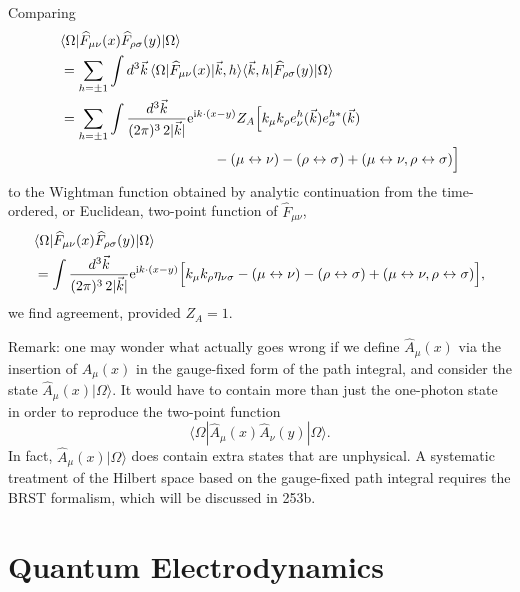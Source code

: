 Comparing
\[
\begin{aligned}
  &\langle\Omega|
  \widehat F_{\mu\nu}(x)\widehat F_{\rho\sigma}(y)
  |\Omega\rangle
\\
  &=
  \sum_{h=\pm1}
  \int d^3\vec k\,
  \langle\Omega|\widehat F_{\mu\nu}(x)|\vec k,h\rangle
  \langle\vec k,h|\widehat F_{\rho\sigma}(y)|\Omega\rangle
\\
  &=
  \sum_{h=\pm1}
  \int\frac{d^3\vec k}{(2\pi)^3\,2|\vec k|}
  \ee^{\ii k\cdot(x-y)}Z_A
  \Bigl[
    k_\mu k_\rho e_\nu^h(\vec k)e_\sigma^{h*}(\vec k)
\\
  &\hspace{11em}
    -(\mu\leftrightarrow\nu)
    -(\rho\leftrightarrow\sigma)
    +(\mu\leftrightarrow\nu,\rho\leftrightarrow\sigma)
  \Bigr]
\end{aligned}
\]
to the Wightman function obtained by analytic continuation from the
time-ordered, or Euclidean, two-point function of \(\widehat F_{\mu\nu}\),
\[
\begin{aligned}
  &\langle\Omega|
  \widehat F_{\mu\nu}(x)\widehat F_{\rho\sigma}(y)
  |\Omega\rangle
\\
  &=
  \int\frac{d^3\vec k}{(2\pi)^3\,2|\vec k|}
  \mathrm{e}^{\mathrm{i} k\cdot(x-y)}
  \Bigl[
    k_\mu k_\rho\eta_{\nu\sigma}
    -(\mu\leftrightarrow\nu)
    -(\rho\leftrightarrow\sigma)
    +(\mu\leftrightarrow\nu,\rho\leftrightarrow\sigma)
  \Bigr],
\end{aligned}
\]
we find agreement, provided \(Z_A=1\).

Remark: one may wonder what actually goes wrong if we define
\(\widehat A_\mu(x)\) via the insertion of \(A_\mu(x)\) in the gauge-fixed
form of the path integral, and consider the state
\(\widehat A_\mu(x)|\Omega\rangle\).  It would have to contain more than
just the one-photon state in order to reproduce the two-point function
\[
  \langle\Omega|\widehat A_\mu(x)\widehat A_\nu(y)|\Omega\rangle.
\]
In fact, \(\widehat A_\mu(x)|\Omega\rangle\) does contain extra states that
are unphysical.  A systematic treatment of the Hilbert space based on the
gauge-fixed path integral requires the BRST formalism, which will be
discussed in 253b.

\section{Quantum Electrodynamics}

